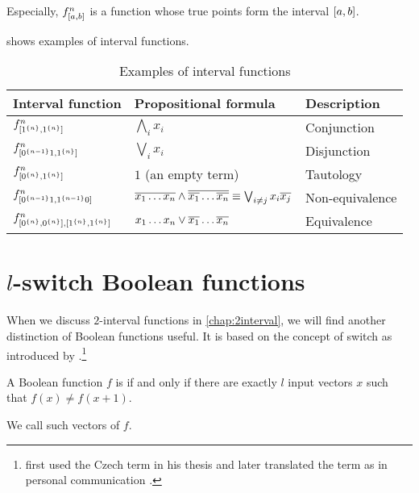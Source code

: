 Especially,
$f^{n}_{[a, b]}$ is a function
whose true points form the interval $[a, b]$.

shows
examples of interval functions.

\begin{table}[h]
\centering
\begin{tabular}{lll}
Interval function & Propositional formula & Description \\
\hline
$f^{n}_{[1^{\{n\}}, 1^{\{n\}}]}$ &
$\bigwedge_i{x_i}$ & Conjunction \\
$f^{n}_{[0^{\{n-1\}} 1, 1^{\{n\}}]}$ &
$\bigvee_i{x_i}$ & Disjunction \\
$f^{n}_{[0^{\{n\}}, 1^{\{n\}}]}$ &
$1$ (an empty term) & Tautology \\
$f^{n}_{[0^{\{n-1\}} 1, 1^{\{n-1\}} 0]}$ &
$\overline{x_1 \ldots x_n} \wedge
\overline{\overline{x_1} \ldots \overline{x_n}}
\equiv \bigvee_{i \neq j}{x_i \overline{x_j}}$ &
Non-equivalence \\
$f^n_{[0^{\{n\}}, 0^{\{n\}}],
[1^{\{n\}}, 1^{\{n\}}]}$ &
$x_1 \ldots x_n \vee \overline{x_1} \ldots \overline{x_n}$ &
Equivalence
\end{tabular}
\caption{Examples of interval functions}
\label{tab:exampleintfns}
\end{table}

\section{\texorpdfstring{$l$}{l}-switch Boolean functions}


When we discuss $2$-interval functions
in \autoref{chap:2interval},
we will find another distinction
of Boolean functions useful.
It is based on the concept of switch
as introduced by \citet{Husek2014,Husek2015}.\footnote{
\citeauthor{Husek2014} first used the Czech term
in his thesis \citep[p.~13]{Husek2014}
and later translated the term as 
in personal communication \citep{Husek2015}.
}

\begin{definition}
A Boolean function $f$ is 
if and only if
there are exactly $l$ input vectors $x$ such that
$f(x) \neq f(x+1)$.

We call such vectors  of $f$.
\end{definition}
